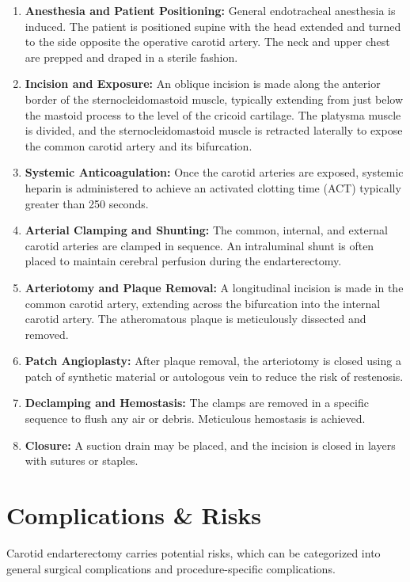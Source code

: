 \begin{enumerate}
  \item \textbf{Anesthesia and Patient Positioning:} General endotracheal anesthesia is induced. The patient is positioned supine with the head extended and turned to the side opposite the operative carotid artery. The neck and upper chest are prepped and draped in a sterile fashion.
  
  \item \textbf{Incision and Exposure:} An oblique incision is made along the anterior border of the sternocleidomastoid muscle, typically extending from just below the mastoid process to the level of the cricoid cartilage. The platysma muscle is divided, and the sternocleidomastoid muscle is retracted laterally to expose the common carotid artery and its bifurcation.

  \item \textbf{Systemic Anticoagulation:} Once the carotid arteries are exposed, systemic heparin is administered to achieve an activated clotting time (ACT) typically greater than 250 seconds.

  \item \textbf{Arterial Clamping and Shunting:} The common, internal, and external carotid arteries are clamped in sequence. An intraluminal shunt is often placed to maintain cerebral perfusion during the endarterectomy.

  \item \textbf{Arteriotomy and Plaque Removal:} A longitudinal incision is made in the common carotid artery, extending across the bifurcation into the internal carotid artery. The atheromatous plaque is meticulously dissected and removed.

  \item \textbf{Patch Angioplasty:} After plaque removal, the arteriotomy is closed using a patch of synthetic material or autologous vein to reduce the risk of restenosis.

  \item \textbf{Declamping and Hemostasis:} The clamps are removed in a specific sequence to flush any air or debris. Meticulous hemostasis is achieved.

  \item \textbf{Closure:} A suction drain may be placed, and the incision is closed in layers with sutures or staples.
\end{enumerate}

\section*{Complications \& Risks}
Carotid endarterectomy carries potential risks, which can be categorized into general surgical complications and procedure-specific complications.

